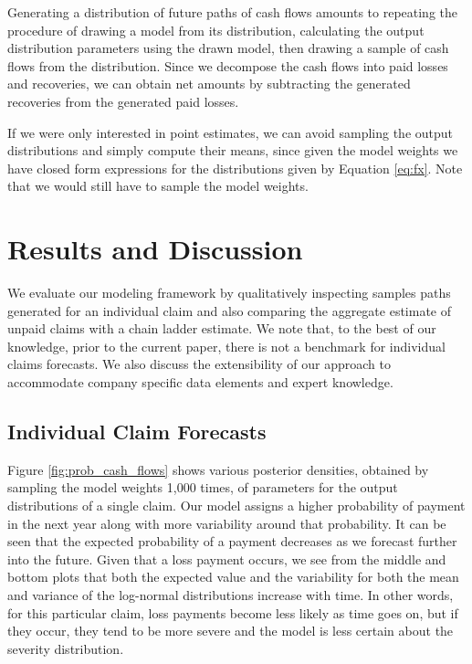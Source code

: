 \documentclass{article}
\begin{document}
Generating a distribution of future paths of cash flows amounts to repeating the procedure of drawing a model from its distribution, calculating the output distribution parameters using the drawn model, then drawing a sample of cash flows from the distribution. Since we decompose the cash flows into paid losses and recoveries, we can obtain net amounts by subtracting the generated recoveries from the generated paid losses.

If we were only interested in point estimates, we can avoid sampling the output distributions and simply compute their means, since given the model weights we have closed form expressions for the distributions given by Equation \ref{eq:fx}. Note that we would still have to sample the model weights.

\section {Results and Discussion}

We evaluate our modeling framework by qualitatively inspecting samples paths generated for an individual claim and also comparing the aggregate estimate of unpaid claims with a chain ladder estimate. We note that, to the best of our knowledge, prior to the current paper, there is not a benchmark for individual claims forecasts. We also discuss the extensibility of our approach to accommodate company specific data elements and expert knowledge.

\subsection{Individual Claim Forecasts}

Figure \ref{fig:prob_cash_flows} shows various posterior densities, obtained by sampling the model weights 1,000 times, of parameters for the output distributions of a single claim. Our model assigns a higher probability of payment in the next year along with more variability around that probability. It can be seen that the expected probability of a payment decreases as we forecast further into the future. Given that a loss payment occurs, we see from the middle and bottom plots that both the expected value and the variability for both the mean and variance of the log-normal distributions increase with time. In other words, for this particular claim, loss payments become less likely as time goes on, but if they occur, they tend to be more severe and the model is less certain about the severity distribution.
\end{document}
